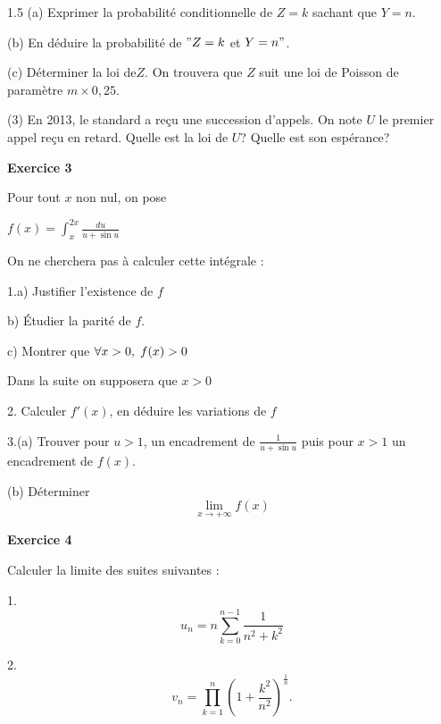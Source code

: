 \documentclass[12pt]{article}
\begin{document}
\begin{spacing}{1.5}
 (a) Exprimer la probabilité conditionnelle de $Z = k$ sachant que $Y = n$.
 
 (b) En déduire la probabilité de $"Z = k$ et $Y = n"$.
 
 (c) Déterminer la loi de$ Z$. On trouvera que $Z$ suit une loi de Poisson de paramètre
 $m\times 0,25$.
 
 (3) En 2013, le standard a reçu une succession d'appels. On note $U$ le premier appel reçu en retard. Quelle est la loi de $U$? Quelle est son espérance?
 
 \medskip\textbf{Exercice 3 }
 
 Pour tout $x$ non nul, on pose
 
 $f(x)=\int_{x}^{2x}\frac{du}{u+\sin u}$
 
 On ne cherchera pas à calculer cette intégrale :
 
 1.a) Justifier l'existence de $f$
 
 b) Étudier la parité de $f$.
 
 c) Montrer que $\forall x>0, \hspace{0.1cm}f(x)>0$
 
 Dans la suite on supposera que $x>0$
 
 2. Calculer $f'(x)$, en déduire les variations de $f$
 
 3.(a) Trouver pour $u>1$, un encadrement de $\frac{1}{u+\sin u}$ puis pour $x>1$ un encadrement de $f(x)$.
 
(b) Déterminer \[
\lim_{x\to +\infty}f(x)
\]

\medskip
\textbf{Exercice 4}

Calculer la limite des suites suivantes :

1. \[
u_n=n\sum_{k=0}^{n-1}\frac{1}{n^2+k^2}
\]

2. \[
v_n=\prod_{k=1}^{n}\left(1+\frac{k^2}{n^2}\right)^{\frac{1}{n}}.
\]
 
 
 
 
 
 
 
 
 
 \newpage

\end{spacing}
\end{document}
